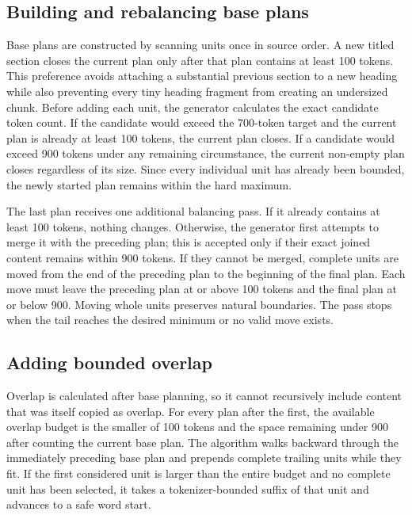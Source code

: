 \subsection{Building and rebalancing base plans}

Base plans are constructed by scanning units once in source order. A new titled
section closes the current plan only after that plan contains at least 100
tokens. This preference avoids attaching a substantial previous section to a
new heading while also preventing every tiny heading fragment from creating an
undersized chunk. Before adding each unit, the generator calculates the exact
candidate token count. If the candidate would exceed the 700-token target and
the current plan is already at least 100 tokens, the current plan closes. If a
candidate would exceed 900 tokens under any remaining circumstance, the current
non-empty plan closes regardless of its size. Since every individual unit has
already been bounded, the newly started plan remains within the hard maximum.

The last plan receives one additional balancing pass. If it already contains
at least 100 tokens, nothing changes. Otherwise, the generator first attempts
to merge it with the preceding plan; this is accepted only if their exact joined
content remains within 900 tokens. If they cannot be merged, complete units are
moved from the end of the preceding plan to the beginning of the final plan.
Each move must leave the preceding plan at or above 100 tokens and the final
plan at or below 900. Moving whole units preserves natural boundaries. The pass
stops when the tail reaches the desired minimum or no valid move exists.

\subsection{Adding bounded overlap}

Overlap is calculated after base planning, so it cannot recursively include
content that was itself copied as overlap. For every plan after the first, the
available overlap budget is the smaller of 100 tokens and the space remaining
under 900 after counting the current base plan. The algorithm walks backward
through the immediately preceding base plan and prepends complete trailing
units while they fit. If the first considered unit is larger than the entire
budget and no complete unit has been selected, it takes a tokenizer-bounded
suffix of that unit and advances to a safe word start.

